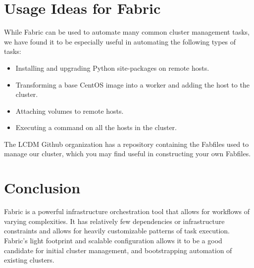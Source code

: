 \documentclass[9pt,twocolumn,twoside]{idsi}
\begin{document}
\section{Usage Ideas for Fabric}
While Fabric can be used to automate many common cluster management tasks, we have found it to be especially useful in automating the following types of tasks:
\begin{itemize}
  \item Installing and upgrading Python site-packages on remote hosts.
  \item Transforming a base CentOS image into a worker and adding the host to the cluster.
  \item Attaching volumes to remote hosts.
  \item Executing a command on all the hosts in the cluster.
\end{itemize}
The LCDM Github organization has a repository containing the Fabfiles used to manage our cluster, which you may find useful in constructing your own Fabfiles.

\section{Conclusion}
Fabric is a powerful infrastructure orchestration tool that allows for workflows of varying complexities. It has relatively few dependencies or infrastructure constraints and allows for heavily customizable patterns of task execution. Fabric's light footprint and scalable configuration allows it to be a good candidate for initial cluster management, and bootstrapping automation of existing clusters.
\end{document}
